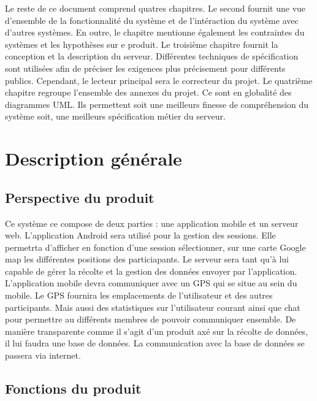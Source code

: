 \documentclass[titlepage, 12pt]{report}
\begin{document}
Le reste de ce document comprend quatres chapitres. Le second fournit une vue d'ensemble de la fonctionnalité du système et de l'intéraction du système avec d'autres systèmes. En outre, le chapitre mentionne également les contraintes du systèmes et les hypothèses sur e produit. Le troisième chapitre fournit la conception et la description du serveur.
Différentes techniques de spécification sont utilisées afin de préciser les exigences plus précisement pour différents publics. Cependant, le lecteur principal sera le correcteur du projet.
Le quatrième chapitre regroupe l'ensemble des annexes du projet. Ce sont en globalité des diagrammes UML. Ils permettent soit une meilleurs finesse de compréhension du système soit, une meilleurs spécification métier du serveur.

\chapter{Description générale}

\section{Perspective du produit}

Ce système ce compose de deux parties : une application mobile et un serveur web.
L'application Android sera utilisé pour la gestion des sessions. Elle permetrta d'afficher en fonction d'une session sélectionner, sur une carte Google map les différentes positions des particiapants.
Le serveur sera tant qu'à lui capable de gérer la récolte et la gestion des données envoyer par l'application.
L'application mobile devra communiquer avec un GPS qui se situe au sein du mobile. Le GPS fournira les emplacements de l'utilisateur et des autres participants. Mais aussi des statistiques sur l'utilisateur courant ainsi que chat pour permettre au différents membres de pouvoir communiquer ensemble.
De manière transparente comme il s'agit d'un produit axé sur la récolte de données, il lui faudra une base de données. La communication avec la base de données se passera via internet.

\section{Fonctions du produit}
\end{document}
